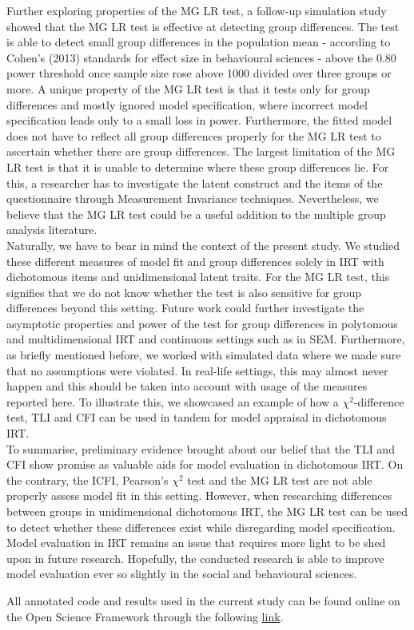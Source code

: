 \documentclass[Royal,sageapa,times,doublespace]{sagej}
\begin{document}
\indent Further exploring properties of the MG LR test, a follow-up simulation study showed that the MG LR test is effective at detecting group differences. The test is able to detect small group differences in the population mean - according to Cohen's (2013) standards for effect size in behavioural sciences - above the 0.80 power threshold once sample size rose above 1000 divided over three groups or more. A unique property of the MG LR test is that it tests only for group differences and mostly ignored model specification, where incorrect model specification leads only to a small loss in power. Furthermore, the fitted model does not have to reflect all group differences properly for the MG LR test to ascertain whether there are group differences. The largest limitation of the MG LR test is that it is unable to determine where these group differences lie. For this, a researcher has to investigate the latent construct and the items of the questionnaire through Measurement Invariance techniques. Nevertheless, we believe that the MG LR test could be a useful addition to the multiple group analysis literature. \\
\indent Naturally, we have to bear in mind the context of the present study. We studied these different measures of model fit and group differences solely in IRT with dichotomous items and unidimensional latent traits. For the MG LR test, this signifies that we do not know whether the test is also sensitive for group differences beyond this setting. Future work could further investigate the asymptotic properties and power of the test for group differences in polytomous and multidimensional IRT and continuous settings such as in SEM. Furthermore, as briefly mentioned before, we worked with simulated data where we made sure that no assumptions were violated. In real-life settings, this may almost never happen and this should be taken into account with usage of the measures reported here. To illustrate this, we showcased an example of how a $\chi^2$-difference test, TLI and CFI can be used in tandem for model appraisal in dichotomous IRT. \\
\indent To summarise, preliminary evidence brought about our belief that the TLI and CFI show promise as valuable aids for model evaluation in dichotomous IRT. On the contrary, the ICFI, Pearson's $\chi^2$ test and the MG LR test are not able properly assess model fit in this setting. However, when researching differences between groups in unidimensional dichotomous IRT, the MG LR test can be used to detect whether these differences exist while disregarding model specification. Model evaluation in IRT remains an issue that requires more light to be shed upon in future research. Hopefully, the conducted research is able to improve model evaluation ever so slightly in the social and behavioural sciences. 

\begin{sm}
All annotated code and results used in the current study can be found online on the Open Science Framework through the following \href{https://osf.io/dtbcr/?view_only=e32e5f8a43124434b5a53a44ff26ad23}{link}.
\end{sm}

\newpage

\nocite{*}


\end{document}
